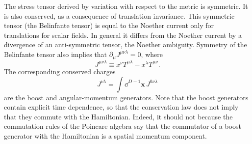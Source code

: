 The stress tensor derived by variation with respect to the metric is symmetric.
It is also conserved, as a consequence of translation invariance. This symmetric
tensor (the Belinfante tensor) is equal to the Noether current only for
translations for scalar fields. In general it differs from the Noether current
by a divergence of an anti-symmetric tensor, the Noether ambiguity. Symmetry of
the Belinfante tensor also implies that $\partial_\mu J^{\mu\nu\lambda}=0$,
where
\begin{equation*}
  J^{\mu\nu\lambda}\equiv x^\nu T^{\mu\lambda}-x^\lambda T^{\mu\nu}.
\end{equation*}
The corresponding conserved charges
\begin{equation*}
  J^{\nu\lambda}=\int\dd^{D-1}\mathbf x\,J^{0\nu\lambda}
\end{equation*}
are the boost and angular-momentum generators. Note that the boost generators
contain explicit time dependence, so that the conservation law does not imply
that they commute with the Hamiltonian. Indeed, it should not because the
commutation rules of the Poincare algebra say that the commutator of a boost
generator with the Hamiltonian is a spatial momentum component.

